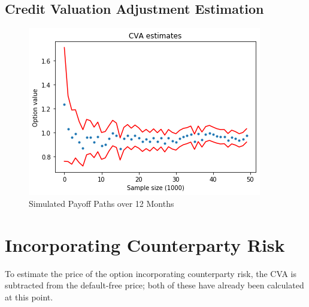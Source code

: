 \documentclass[11pt]{article}
\begin{document}
\subsection{Credit Valuation Adjustment Estimation}
\begin{figure}
    \centering
    \caption{Simulated Payoff Paths over 12 Months}
    \includegraphics{images/cva.png}
\end{figure}


\section{Incorporating Counterparty Risk}

To estimate the price of the option incorporating counterparty risk, the CVA is subtracted from the default-free price; both of these have already been calculated at this point.
\end{document}
